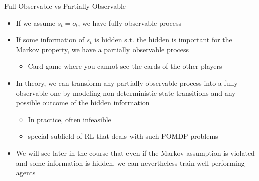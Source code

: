 \documentclass[aspectratio=169]{../latex_main/tntbeamer}  %
\begin{document}
\begin{frame}[c]{Full Observable vs Partially Observable}
	
	\begin{itemize}
		\item If we assume $s_t = o_t$, we have fully observable process
		\pause
		\item If some information of $s_t$ is hidden s.t. the hidden is important for the Markov property, we have a partially observable process
		\begin{itemize}
			\item Card game where you cannot see the cards of the other players
		\end{itemize}
		\pause
		\medskip
		\item In theory, we can transform any partially observable process into a fully observable one by modeling non-deterministic state transitions and any possible outcome of the hidden information
		\begin{itemize}
			\item In practice, often infeasible
			\item special subfield of RL that deals with such POMDP problems
		\end{itemize}
		\pause
		\medskip
		\item We will see later in the course that even if the Markov assumption is violated and some information is hidden, we can nevertheless train well-performing agents
	\end{itemize}

\end{frame}
\end{document}
